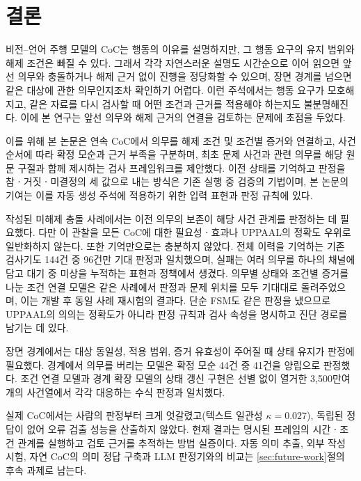 \section{결론}
\label{sec:conclusion}

\begin{revision}

비전--언어 주행 모델의 CoC는 행동의 이유를 설명하지만, 그 행동 요구의 유지 범위와 해제 조건은 빠질 수 있다. 그래서 각각 자연스러운 설명도 시간순으로 이어 읽으면 앞선 의무와 충돌하거나 해제 근거 없이 진행을 정당화할 수 있으며, 장면 경계를 넘으면 같은 대상에 관한 의무인지조차 확인하기 어렵다. 이런 주석에서는 행동 요구가 모호해지고, 같은 자료를 다시 검사할 때 어떤 조건과 근거를 적용해야 하는지도 불분명해진다. 이에 본 연구는 앞선 의무와 해제 근거의 연결을 검토하는 문제에 초점을 두었다.

이를 위해 본 논문은 연속 CoC에서 의무를 해제 조건 및 조건별 증거와 연결하고, 사건 순서에 따라 확정 모순과 근거 부족을 구분하며, 최초 문제 사건과 관련 의무를 해당 원문 구절과 함께 제시하는 검사 프레임워크를 제안했다. 이전 상태를 기억하고 판정을 참ㆍ거짓ㆍ미결정의 세 값으로 내는 방식은 기존 실행 중 검증의 기법이며, 본 논문의 기여는 이를 자동 생성 주석에 적용하기 위한 입력 표현과 판정 규칙에 있다.

작성된 미해제 충돌 사례에서는 이전 의무의 보존이 해당 사건 관계를 판정하는 데 필요했다. 다만 이 관찰을 모든 CoC에 대한 필요성ㆍ효과나 UPPAAL의 정확도 우위로 일반화하지 않는다. 또한 기억만으로는 충분하지 않았다. 전체 이력을 기억하는 기존 검사기도 144건 중 96건만 기대 판정과 일치했으며, 실패는 여러 의무를 하나의 채널에 담고 대기 중 미상을 누적하는 표현과 정책에서 생겼다. 의무별 상태와 조건별 증거를 나눈 조건 연결 모델은 같은 사례에서 판정과 문제 위치를 모두 기대대로 돌려주었으며, 이는 개발 후 동일 사례 재시험의 결과다. 단순 FSM도 같은 판정을 냈으므로 UPPAAL의 의의는 정확도가 아니라 판정 규칙과 검사 속성을 명시하고 진단 경로를 남기는 데 있다.

장면 경계에서는 대상 동일성, 적용 범위, 증거 유효성이 주어질 때 상태 유지가 판정에 필요했다. 경계에서 의무를 버리는 모델은 확정 모순 44건 중 41건을 양립으로 판정했다. 조건 연결 모델과 경계 확장 모델의 상태 갱신 구현은 선별 없이 열거한 3,500만여 개의 사건열에서 각각 대응하는 수식 판정과 일치했다.

실제 CoC에서는 사람의 판정부터 크게 엇갈렸고(텍스트 일관성 $\kappa=0.027$), 독립된 정답이 없어 오류 검출 성능을 산출하지 않았다. 현재 결과는 명시된 프레임의 시간ㆍ조건 관계를 실행하고 검토 근거를 추적하는 방법 실증이다. 자동 의미 추출, 외부 작성 시험, 자연 CoC의 의미 정답 구축과 LLM 판정기와의 비교는 \ref{sec:future-work}절의 후속 과제로 남는다.
\end{revision}

